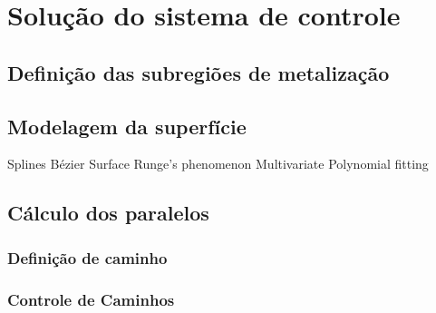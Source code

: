 \section{Solução do sistema de controle}


\subsection{Definição das subregiões de metalização}

\subsection{Modelagem da superfície}

Splines
Bézier Surface
Runge's phenomenon
Multivariate Polynomial fitting

\subsection{Cálculo dos paralelos}

\subsubsection{Definição de caminho}

\subsubsection{Controle de Caminhos}